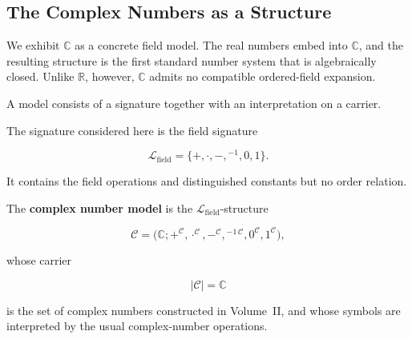 %

\subsection*{The Complex Numbers as a Structure}

\begin{remark*}
We exhibit $\mathbb{C}$ as a concrete field model. The real numbers embed into
$\mathbb{C}$, and the resulting structure is the first standard number system
that is algebraically closed. Unlike $\mathbb{R}$, however, $\mathbb{C}$ admits
no compatible ordered-field expansion.
\end{remark*}


\begin{remark*}[Exposition]

A model consists of a signature together with an interpretation on a carrier.

The signature considered here is the field signature

\[
\mathcal L_{\mathrm{field}}
=
\{+,\cdot,-,{}^{-1},0,1\}.
\]

It contains the field operations and distinguished constants but no order
relation.

\end{remark*}


\begin{definition}
\label{def:complex-number-model}

The \textbf{complex number model} is the
$\mathcal L_{\mathrm{field}}$-structure

\[
\mathcal C
=
\bigl(
\mathbb C;
+^{\mathcal C},
\cdot^{\mathcal C},
-^{\mathcal C},
{}^{-1\,\mathcal C},
0^{\mathcal C},
1^{\mathcal C}
\bigr),
\]

whose carrier

\[
|\mathcal C|
=
\mathbb C
\]

is the set of complex numbers constructed in Volume~II, and whose symbols
are interpreted by the usual complex-number operations.

\end{definition}

